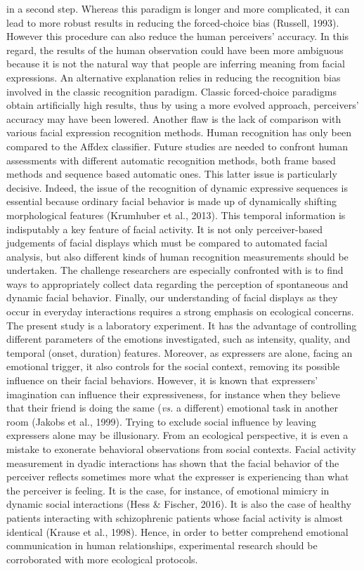 \documentclass[
  english,
  man]{apa7}
\begin{document}
in a second step. Whereas this paradigm is longer and more complicated, it can lead to more robust results in reducing the forced-choice bias (Russell, 1993). However this procedure can also reduce the human perceivers' accuracy. In this regard, the results of the human observation could have been more ambiguous because it is not the natural way that people are inferring meaning from facial expressions. An alternative explanation relies in reducing the recognition bias involved in the classic recognition paradigm. Classic forced-choice paradigms obtain artificially high results, thus by using a more evolved approach, perceivers' accuracy may have been lowered. Another flaw is the lack of comparison with various facial expression recognition methods. Human recognition has only been compared to the Affdex classifier. Future studies are needed to confront human assessments with different automatic recognition methods, both frame based methods and sequence based automatic ones. This latter issue is particularly decisive. Indeed, the issue of the recognition of dynamic expressive sequences is essential because ordinary facial behavior is made up of dynamically shifting morphological features (Krumhuber et al., 2013). This temporal information is indisputably a key feature of facial activity. It is not only perceiver-based judgements of facial displays which must be compared to automated facial analysis, but also different kinds of human recognition measurements should be undertaken. The challenge researchers are especially confronted with is to find ways to appropriately collect data regarding the perception of spontaneous and dynamic facial behavior. Finally, our understanding of facial displays as they occur in everyday interactions requires a strong emphasis on ecological concerns. The present study is a laboratory experiment. It has the advantage of controlling different parameters of the emotions investigated, such as intensity, quality, and temporal (onset, duration) features. Moreover, as expressers are alone, facing an emotional trigger, it also controls for the social context, removing its possible influence on their facial behaviors. However, it is known that expressers' imagination can influence their expressiveness, for instance when they believe that their friend is doing the same (\emph{vs.} a different) emotional task in another room (Jakobs et al., 1999). Trying to exclude social influence by leaving expressers alone may be illusionary. From an ecological perspective, it is even a mistake to exonerate behavioral observations from social contexts. Facial activity measurement in dyadic interactions has shown that the facial behavior of the perceiver reflects sometimes more what the expresser is experiencing than what the perceiver is feeling. It is the case, for instance, of emotional mimicry in dynamic social interactions (Hess \& Fischer, 2016). It is also the case of healthy patients interacting with schizophrenic patients whose facial activity is almost identical (Krause et al., 1998). Hence, in order to better comprehend emotional communication in human relationships, experimental research should be corroborated with more ecological protocols.
\end{document}
